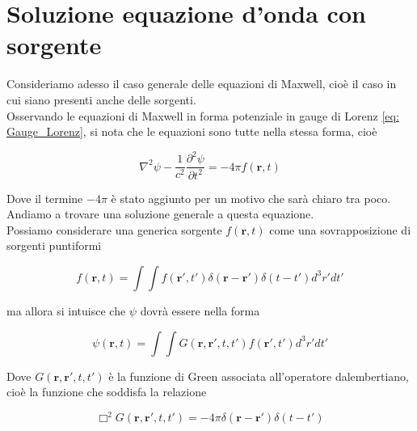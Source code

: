 \section{Soluzione equazione d'onda con sorgente}

Consideriamo adesso il caso generale delle equazioni di Maxwell, cioè il caso in cui siano presenti anche delle sorgenti.\\

Osservando le equazioni di Maxwell in forma potenziale in gauge di Lorenz \ref{eq: Gauge_Lorenz}, si nota che le equazioni sono tutte nella stessa forma, cioè

\begin{tcolorbox}[colback=yellow!10!white, colframe=orange!70!black, boxrule=0.8pt]
\begin{equation}\label{eq: equazione_onda_non_omogenea}
    \nabla^2 \psi - \frac{1}{c^2} \frac{\partial^2 \psi}{\partial t^2} = -4 \pi f(\mathbf{r},t)
\end{equation}
\end{tcolorbox}

Dove il termine $-4 \pi$ è stato aggiunto per un motivo che sarà chiaro tra poco. \\

Andiamo a trovare una soluzione generale a questa equazione.\\

Possiamo considerare una generica sorgente $f(\mathbf{r}, t)$ come una sovrapposizione di sorgenti puntiformi

\begin{equation}
    f(\mathbf{r}, t) = \int \int f(\mathbf{r'}, t') \delta(\mathbf{r} - \mathbf{r'}) \delta(t - t') d^3 r' dt'
\end{equation}

ma allora si intuisce che $\psi$ dovrà essere nella forma 

\begin{equation}
    \psi (\mathbf{r}, t) = \int \int G(\mathbf{r},\mathbf{r'}, t, t') f (\mathbf{r'}, t') d^3 r' dt'
\end{equation}

Dove $G(\mathbf{r},\mathbf{r'}, t, t')$ è la funzione di Green associata all'operatore dalembertiano, cioè la funzione che soddisfa la relazione 

\begin{equation}
    \Box^2 G(\mathbf{r}, \mathbf{r'}, t, t') = - 4 \pi \delta(\mathbf{r} - \mathbf{r'}) \delta(t -t')
\end{equation}

